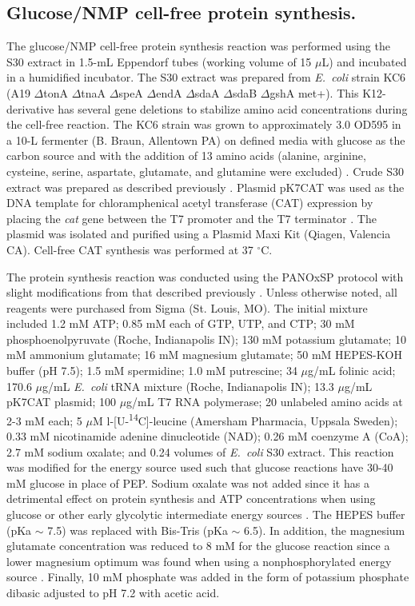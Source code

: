 \documentclass[journal=asbcd6,manuscript=article]{achemso}
\begin{document}
\subsection*{Glucose/NMP cell-free protein synthesis.}
The glucose/NMP cell-free protein synthesis reaction was
performed using the S30 extract in 1.5-mL Eppendorf tubes (working volume of 15 $\mu$L) and incubated in a humidified incubator.
The S30 extract was prepared from \textit{E.~coli} strain KC6 (A19 $\Delta$tonA $\Delta$tnaA $\Delta$speA $\Delta$endA $\Delta$sdaA $\Delta$sdaB $\Delta$gshA met+).
This K12-derivative has several gene deletions to stabilize amino acid concentrations during the cell-free reaction.
The KC6 strain was grown to approximately 3.0 OD595 in a 10-L fermenter (B. Braun, Allentown PA) on defined media with glucose as the carbon source and with the addition of 13 amino acids (alanine, arginine, cysteine, serine, aspartate, glutamate, and glutamine were excluded) \cite{Zawada:2003}. Crude S30 extract was prepared as described previously \cite{Jewett:2002}.
Plasmid pK7CAT was used as the DNA template for chloramphenical acetyl transferase (CAT) expression by placing the \emph{cat} gene
between the T7 promoter and the T7 terminator \cite{Kigawa1995}.
The plasmid was isolated and purified using a Plasmid Maxi Kit (Qiagen, Valencia CA).
Cell-free CAT synthesis was performed at 37 $^{\circ}$C.

The protein synthesis reaction was conducted using the PANOxSP protocol with slight modifications from that described previously \cite{BIT:BIT20026}.
Unless otherwise noted, all reagents were purchased from Sigma (St. Louis, MO).
The initial mixture included 1.2 mM ATP; 0.85 mM each of GTP, UTP, and CTP; 30 mM phosphoenolpyruvate (Roche, Indianapolis IN); 130 mM potassium glutamate; 10 mM ammonium glutamate; 16 mM magnesium glutamate; 50 mM HEPES-KOH buffer (pH 7.5); 1.5 mM spermidine; 1.0 mM putrescine; 34 $\mu$g/mL folinic acid; 170.6 $\mu$g/mL \textit{E.~coli} tRNA mixture (Roche, Indianapolis IN); 13.3 $\mu$g/mL pK7CAT plasmid; 100 $\mu$g/mL T7 RNA polymerase; 20 unlabeled amino acids at 2-3 mM each; 5 $\mu$M l-[U-\textsuperscript{14}C]-leucine (Amersham Pharmacia, Uppsala Sweden); 0.33 mM nicotinamide adenine dinucleotide (NAD); 0.26 mM coenzyme A (CoA); 2.7 mM sodium oxalate; and 0.24 volumes of \textit{E.~coli} S30 extract.
This reaction was modified for the energy source used such that glucose reactions have 30-40 mM glucose in place of PEP.
Sodium oxalate was not added since it has a detrimental effect on protein synthesis and ATP concentrations when using glucose or other early glycolytic intermediate energy sources \cite{BIT:BIT1121}. The HEPES buffer (pKa $\sim$ 7.5) was replaced with Bis-Tris (pKa $\sim$ 6.5). In addition, the magnesium glutamate concentration was reduced to 8 mM for the glucose reaction since a lower magnesium optimum was found when using a nonphosphorylated energy source \cite{BIT:BIT20026}. Finally, 10 mM phosphate was added in the form of potassium phosphate dibasic adjusted to pH 7.2 with acetic acid.
\end{document}
